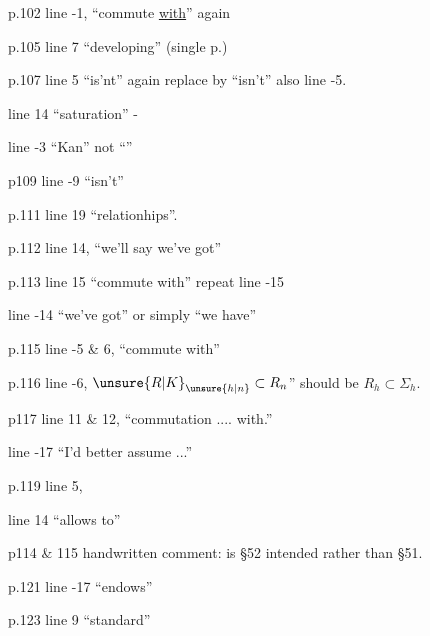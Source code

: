 

p.102 line -1, ``commute \uline{with}'' again

p.105 line 7 ``developing'' (single p.)

p.107 line 5 ``is'nt'' again replace by ``isn't'' also  line -5.

line 14 ``saturation'' -

line -3 ``Kan'' not ``''

p109 line -9 ``isn't''

p.111 line 19 ``relationhips''.

p.112 line 14, ``we'll say we've got''

p.113 line 15 ``commute with'' repeat line -15

line -14 ``we've got'' or simply ``we have''

p.115\unsure{:} line -5 \& 6, ``commute with''


p.116 line -6, $\unsure{R|K}_{\unsure{h|n}}\subset R_n$'' should be $R_h\subset\Sigma_h$.

p117 line 11 \& 12, ``commutation .... with.''

line -17 ``I'd better assume ...''

p.119 line 5, 

line 14 ``allows  to''

p114 \& 115 handwritten comment: is \S52 intended rather than \S51.

p.121 line -17 ``endows''


p.123 line 9 ``standard''

